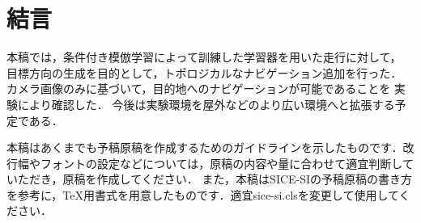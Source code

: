 \documentclass{sice-si}
\begin{document}
\section{結言}
本稿では，条件付き模倣学習によって訓練した学習器を用いた走行に対して，
目標方向の生成を目的として，トポロジカルなナビゲーション追加を行った．
カメラ画像のみに基づいて，目的地へのナビゲーションが可能であることを
実験により確認した．
今後は実験環境を屋外などのより広い環境へと拡張する予定である．

本稿はあくまでも予稿原稿を作成するためのガイドラインを示したものです．改行幅やフォントの設定などについては，原稿の内容や量に合わせて適宜判断していただき，原稿を作成してください．
また，本稿はSICE-SIの予稿原稿の書き方\cite{SI}\cite{SIbook}\cite{WebPage}を参考に，\TeX 用書式を用意したものです．適宜sice-si.clsを変更して使用してください．



\printbibliography[title=参考文献]
\end{document}
